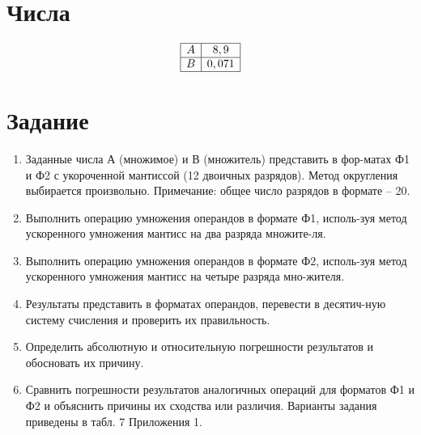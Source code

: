 \documentclass{article}
\begin{document}
\itmo[
       variant=109,
       labn=7,
       worktype=Домашняя работа,
       discipline=Дискретная математика,
       group=P3115,
       student=Владимир Мацюк,
       teacher=Поляков Владимир Иванович,
       logo=../../../lib/img/itmo.png
]

\newcommand{\car}{\multicolumn{1}{c@{\hspace*{\tabcolsep}\makebox[0pt]{\curvearrowleft}}}{}}
\newcommand{\rcar}{\multicolumn{1}{c@{\hspace*{\tabcolsep}\makebox[0pt]{\curvearrowright}}}{}}
\newcommand{\ncar}{\multicolumn{1}{c@{\hspace*{\tabcolsep}\makebox[0pt]{}}}{}}
\newcommand{\SPACE}{\multicolumn{12}{c}{}}
\newcommand{\INT}{\multicolumn{5}{c}{\MM{Интерпретации}}}
\newcommand{\PLUS}{\multirow{2}{*}{+}}
\newcommand{\MINUS}{\multirow{2}{*}{-}}
\newcommand{\SIGN}{\multicolumn{2}{c}{\MM{Знаковая}}}
\newcommand{\USIGN}{\multicolumn{2}{c}{\MM{Беззнаковая}}}

\section{Числа}
$$
       \begin{array}{|c|c|}
              \hline
              A & 8,9 \\\hline
              B & 0,071 \\\hline
       \end{array}
$$
\section{Задание}

\begin{enumerate}
       \item Заданные числа А (множимое) и В (множитель) представить в фор-матах Ф1 и Ф2 с укороченной мантиссой (12 двоичных разрядов). Метод округления выбирается произвольно.
             Примечание: общее число разрядов в формате – 20.
       \item Выполнить операцию умножения операндов в формате Ф1, исполь-зуя метод ускоренного умножения мантисс на два разряда множите-ля.
       \item Выполнить операцию умножения операндов в формате Ф2, исполь-зуя метод ускоренного умножения мантисс на четыре разряда мно-жителя.
       \item Результаты представить в форматах операндов, перевести в десятич-ную систему счисления и проверить их правильность.
       \item Определить абсолютную и относительную погрешности результатов и обосновать их причину.
       \item Сравнить погрешности результатов аналогичных операций для форматов Ф1 и Ф2 и объяснить причины их сходства или различия.
             Варианты задания приведены в табл. 7 Приложения 1.
             
\end{enumerate}
\end{document}
